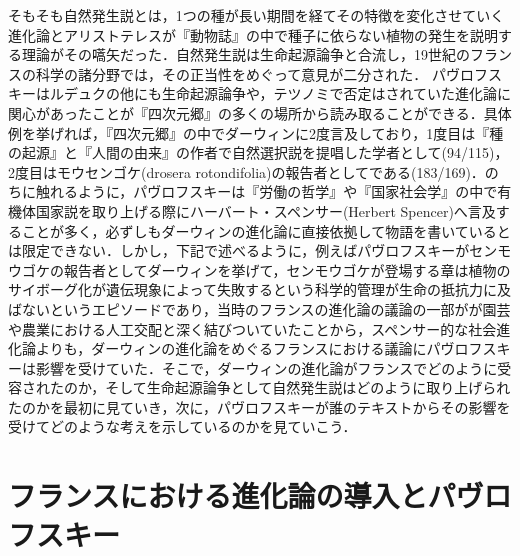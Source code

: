 そもそも自然発生説とは，1つの種が長い期間を経てその特徴を変化させていく進化論とアリストテレスが『動物誌』の中で種子に依らない植物の発生を説明する理論がその嚆矢だった．自然発生説は生命起源論争と合流し，19世紀のフランスの科学の諸分野では，その正当性をめぐって意見が二分された． パヴロフスキーはルデュクの他にも生命起源論争や，テツノミで否定はされていた進化論に関心があったことが『四次元郷』の多くの場所から読み取ることができる．具体例を挙げれば，『四次元郷』の中でダーウィンに2度言及しており，1度目は『種の起源』と『人間の由来』の作者で自然選択説を提唱した学者として(94/115)，2度目はモウセンゴケ(drosera rotondifolia)の報告者としてである(183/169)．のちに触れるように，パヴロフスキーは『労働の哲学』や『国家社会学』の中で有機体国家説を取り上げる際にハーバート・スペンサー(Herbert Spencer)へ言及することが多く，必ずしもダーウィンの進化論に直接依拠して物語を書いているとは限定できない．しかし，下記で述べるように，例えばパヴロフスキーがセンモウゴケの報告者としてダーウィンを挙げて，センモウゴケが登場する章は植物のサイボーグ化が遺伝現象によって失敗するという科学的管理が生命の抵抗力に及ばないというエピソードであり，当時のフランスの進化論の議論の一部がが園芸や農業における人工交配と深く結びついていたことから，スペンサー的な社会進化論よりも，ダーウィンの進化論をめぐるフランスにおける議論にパヴロフスキーは影響を受けていた．そこで，ダーウィンの進化論がフランスでどのように受容されたのか，そして生命起源論争として自然発生説はどのように取り上げられたのかを最初に見ていき，次に，パヴロフスキーが誰のテキストからその影響を受けてどのような考えを示しているのかを見ていこう．

\section{フランスにおける進化論の導入とパヴロフスキー}

